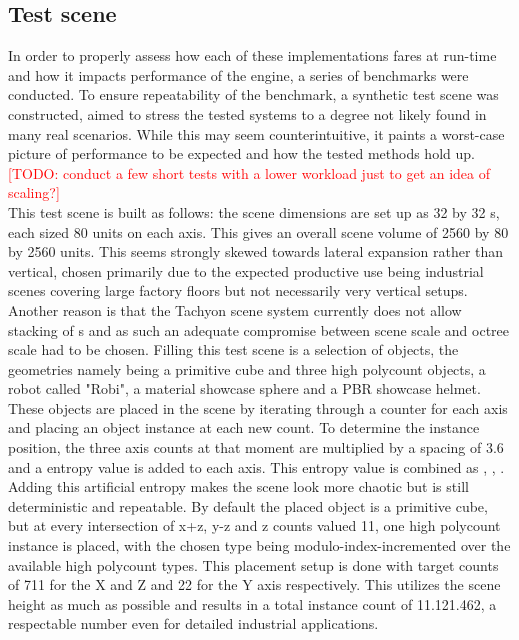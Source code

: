\subsection{Test scene}
In order to properly assess how each of these implementations fares at run-time and how it impacts performance of the engine, a series of benchmarks were conducted. To ensure repeatability of the benchmark, a synthetic test scene was constructed, aimed to stress the tested systems to a degree not likely found in many real scenarios. While this may seem counterintuitive, it paints a worst-case picture of performance to be expected and how the tested methods hold up. \textcolor{red}{[TODO: conduct a few short tests with a lower workload just to get an idea of scaling?]} \\
This test scene is built as follows: the scene dimensions are set up as 32 by 32 s, each  sized 80 units on each axis. This gives an overall scene volume of 2560 by 80 by 2560 units. This seems strongly skewed towards lateral expansion rather than vertical, chosen primarily due to the expected productive use being industrial scenes covering large factory floors but not necessarily very vertical setups. Another reason is that the Tachyon scene  system currently does not allow stacking of s and as such an adequate compromise between scene scale and octree scale had to be chosen. 
Filling this test scene is a selection of objects, the geometries namely being a primitive cube and three high polycount objects, a robot called "Robi", a material showcase sphere and a PBR showcase helmet. These objects are placed in the scene by iterating through a counter for each axis and placing an object instance at each new count. To determine the instance position, the three axis counts at that moment are multiplied by a spacing of 3.6 and a entropy value is added to each axis. This entropy value is combined as , , . Adding this artificial entropy makes the scene look more chaotic but is still deterministic and repeatable.
By default the placed object is a primitive cube, but at every intersection of x+z, y-z and z counts valued 11, one high polycount instance is placed, with the chosen type being modulo-index-incremented over the available high polycount types. 
This placement setup is done with target counts of 711 for the X and Z and 22 for the Y axis respectively. This utilizes the scene height as much as possible and results in a total instance count of 11.121.462, a respectable number even for detailed industrial applications. \\
